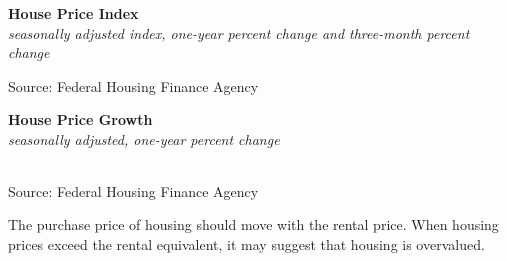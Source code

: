 \documentclass{report}
\makeatletter
\newcommand{\tbllink}[1]{\href{https://raw.githubusercontent.com/bdecon/US-chartbook/master/chartbook/data/#1}{\faTable}}
\newcommand*\short[1]{\expandafter\@gobbletwo\number\numexpr#1\relax}
\newcommand{\dateaxisticks}{
		date coordinates in=x, axis line style={draw=none},
		xmax={2022-10-31},
		max space between ticks=40,	    
		xtick={{1990-01-01}, {1992-01-01}, {1994-01-01}, 
			{1996-01-01}, {1998-01-01}, {2000-01-01}, 
			{2002-01-01}, {2004-01-01}, {2006-01-01},
			{2008-01-01}, {2010-01-01}, {2012-01-01}, {2014-01-01},
		    {2016-01-01}, {2018-01-01}, {2020-01-01}, {2022-01-01}, 
		    {2024-01-01}, {2026-01-01}},
		minor xtick={{1989-01-01}, {1991-01-01}, {1993-01-01},
			{1995-01-01}, {1997-01-01}, {1999-01-01}, 
			{2001-01-01}, {2003-01-01}, {2005-01-01}, {2007-01-01},
		    {2009-01-01}, {2011-01-01}, {2013-01-01}, {2015-01-01},
		    {2017-01-01}, {2019-01-01}, {2021-01-01}, {2023-01-01}, 
		    {2025-01-01}, {2027-01-01}},
		enlarge y limits={0.06}, enlarge x limits={0.01},
		}
\newcommand{\bbar}[2]{extra #1 ticks = {{#2}}, extra #1 tick labels = ,
		extra #1 tick style = {grid=major, grid style={thick, black!25}},}
\newcommand{\stdline}[4]{\addplot[very thick, no markers, color=#1] 
		table [x=#2, y=#3, col sep=comma] {#4};	}
\newcommand{\thickline}[4]{\addplot[ultra thick, no markers, color=#1] 
		table [x=#2, y=#3, col sep=comma] {#4};	}
\newcommand{\rebars}{
		\fill[color=black!10] (axis cs:{2007-12-01},\pgfkeysvalueof{/pgfplots/ymin}) rectangle 
			(axis cs:{2009-07-01}, \pgfkeysvalueof{/pgfplots/ymax});
		\fill[color=black!10] (axis cs:{2001-03-01},\pgfkeysvalueof{/pgfplots/ymin}) rectangle 
			(axis cs:{2001-11-01}, \pgfkeysvalueof{/pgfplots/ymax});
		\fill[color=black!10] (axis cs:{2020-02-01},\pgfkeysvalueof{/pgfplots/ymin}) rectangle 
			(axis cs:{2020-05-01}, \pgfkeysvalueof{/pgfplots/ymax});}
\makeatother
\begin{document}
{\begin{minipage}{0.76\textwidth}
\normalsize \textbf{House Price Index}\\
\footnotesize{\textit{seasonally adjusted index, one-year percent change and three-month percent change}}
\vspace{3.4cm}

\hspace{4mm} 

\footnotesize{Source: Federal Housing Finance Agency} \hfill \tbllink{hpi.csv}
\vspace{1mm}

\normalsize{\textbf{House Price Growth}}\\
\footnotesize{\textit{seasonally adjusted, one-year percent change}}\\
\hspace*{-3mm} \noindent {} \setlength{\tabcolsep}{2.1pt} \color{black!90}
		{\renewcommand{\arraystretch}{1.45}
		 \begin{tabular}{p{25mm} R{8mm} R{8mm} R{8mm} R{8mm} R{8mm} R{8mm} R{8mm} R{12.0mm} R{10.8mm}}
			  \hline
		\end{tabular}}
		
	\vspace{-2mm}
\footnotesize{Source: Federal Housing Finance Agency} \hfill \tbllink{hpi.csv}
\end{minipage}
\vspace{3mm}

\begin{minipage}{0.33\textwidth}
\small The purchase price of housing should move with the rental price. When housing prices exceed the rental equivalent, it may suggest that housing is overvalued. 


\end{minipage}}
\end{document}
